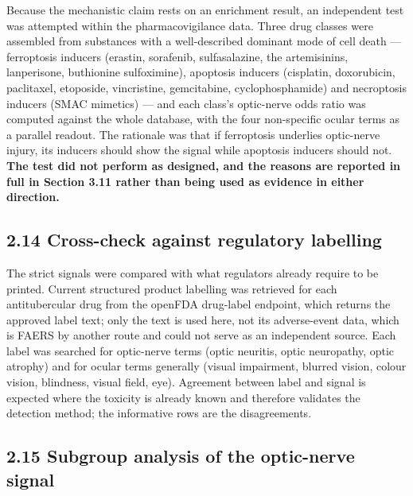 \documentclass[utf8]{FrontiersinVancouver}
\begin{document}
Because the mechanistic claim rests on an enrichment result, an independent test was attempted within the pharmacovigilance data. Three drug classes were assembled from substances with a well-described dominant mode of cell death --- ferroptosis inducers (erastin, sorafenib, sulfasalazine, the artemisinins, lanperisone, buthionine sulfoximine), apoptosis inducers (cisplatin, doxorubicin, paclitaxel, etoposide, vincristine, gemcitabine, cyclophosphamide) and necroptosis inducers (SMAC mimetics) --- and each class's optic-nerve odds ratio was computed against the whole database, with the four non-specific ocular terms as a parallel readout. The rationale was that if ferroptosis underlies optic-nerve injury, its inducers should show the signal while apoptosis inducers should not. \textbf{The test did not perform as designed, and the reasons are reported in full in Section 3.11 rather than being used as evidence in either direction.}

\subsection{2.14 Cross-check against regulatory labelling}

The strict signals were compared with what regulators already require to be printed. Current structured product labelling was retrieved for each antitubercular drug from the openFDA drug-label endpoint, which returns the approved label text; only the text is used here, not its adverse-event data, which is FAERS by another route and could not serve as an independent source. Each label was searched for optic-nerve terms (optic neuritis, optic neuropathy, optic atrophy) and for ocular terms generally (visual impairment, blurred vision, colour vision, blindness, visual field, eye). Agreement between label and signal is expected where the toxicity is already known and therefore validates the detection method; the informative rows are the disagreements.

\subsection{2.15 Subgroup analysis of the optic-nerve signal}
\end{document}
